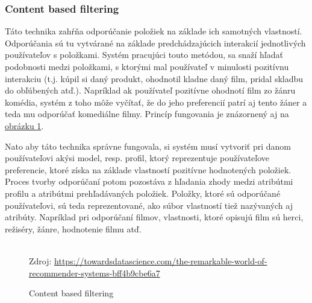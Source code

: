\subsubsection{Content based filtering}
\label{sec:contentbased}
Táto technika zahŕňa odporúčanie položiek na základe ich samotných vlastností. Odporúčania sú tu vytvárané na základe predchádzajúcich interakcií jednotlivých používateľov s položkami. Systém pracujúci touto metódou, sa snaží hľadať podobnosti medzi položkami, s ktorými mal používateľ v minulosti pozitívnu interakciu (t.j. kúpil si daný produkt, ohodnotil kladne daný film, pridal skladbu do obľúbených atď.). Napríklad ak používateľ pozitívne ohodnotí film zo žánru komédia, systém z toho môže vyčítať, že do jeho preferencií patrí aj tento žáner a teda mu odporúčať komediálne filmy. Princíp fungovania je znázornený aj na \hyperref[contentFiltering]{obrázku \ref{contentFiltering}}.

Nato aby táto technika správne fungovala, si systém musí vytvoriť pri danom používateľovi akýsi model, resp. profil, ktorý reprezentuje používateľove preferencie, ktoré získa na základe vlastností pozitívne hodnotených položiek. Proces tvorby odporúčaní potom pozostáva z hľadania zhody medzi atribútmi profilu a atribútmi prehľadávaných položiek. Položky, ktoré sú odporúčané používateľovi, sú teda reprezentované, ako súbor vlastností tiež nazývaných aj atribúty. Napríklad pri odporúčaní filmov, vlastnosti, ktoré opisujú film sú herci, režiséry, žánre, hodnotenie filmu atď.\\\\
\begin{figure}[!htbp]
  \centering  
  \def\stackalignment{c}
           {\scriptsize%
            Zdroj: \url{https://towardsdatascience.com/the-remarkable-world-of-recommender-systems-bff4b9cbe6a7}}
  \caption{Content based filtering}
  
  \label{contentFiltering}
\end{figure}

